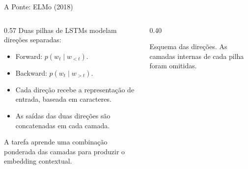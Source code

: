 \documentclass[aspectratio=169, xcolor=dvipsnames]{beamer}
\begin{document}
  \begin{frame}{A Ponte: ELMo (2018)}
    \begin{columns}[T]
      \begin{column}{0.57\textwidth}
        Duas pilhas de LSTMs modelam direções separadas:
        \begin{itemize}
          \item Forward: $p(w_t\mid w_{<t})$.
          \item Backward: $p(w_t\mid w_{>t})$.
          \item Cada direção recebe a representação de entrada, baseada em caracteres.
          \item As saídas das duas direções são concatenadas em cada camada.
        \end{itemize}
        A tarefa aprende uma combinação ponderada das camadas para
        produzir o embedding contextual.
      \end{column}
      \begin{column}{0.40\textwidth}
        \centering
        \par\smallskip
        {\scriptsize Esquema das direções. As camadas internas de cada pilha foram omitidas.}
      \end{column}
    \end{columns}
  \end{frame}
\end{document}
